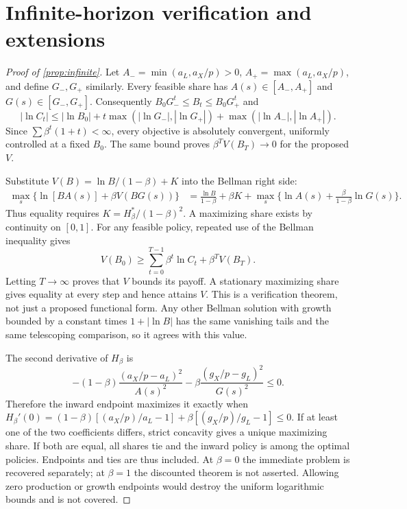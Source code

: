 \documentclass[11pt,a4paper]{article}
\theoremstyle{definition}\newtheorem{definition}{Definition}
\begin{document}
\section{Infinite-horizon verification and extensions}
\label{app:infinite-proof}
\begin{proof}[Proof of \cref{prop:infinite}]
Let $A_-=\min(a_L,a_X/p)>0$, $A_+=\max(a_L,a_X/p)$, and define
$G_-,G_+$ similarly. Every feasible share has $A(s)\in[A_-,A_+]$
and $G(s)\in[G_-,G_+]$. Consequently
$B_0G_-^t\leq B_t\leq B_0G_+^t$ and
\[
 |\ln C_t|\leq |\ln B_0|+
 t\max(|\ln G_-|,|\ln G_+|)+
 \max(|\ln A_-|,|\ln A_+|).
\]
Since $\sum\beta^t(1+t)<\infty$, every objective is absolutely
convergent, uniformly controlled at a fixed $B_0$. The same bound proves
$\beta^T V(B_T)\to0$ for the proposed $V$.

Substitute $V(B)=\ln B/(1-\beta)+K$ into the Bellman right side:
\begin{align*}
 \max_s\{\ln[BA(s)]+\beta V(BG(s))\}
 &=\frac{\ln B}{1-\beta}+\beta K+
 \max_s\{\ln A(s)+\tfrac\beta{1-\beta}\ln G(s)\}.
\end{align*}
Thus equality requires $K=H_\beta^*/(1-\beta)^2$. A maximizing share
exists by continuity on $[0,1]$. For any feasible policy, repeated use of
the Bellman inequality gives
\[
 V(B_0)\geq\sum_{t=0}^{T-1}\beta^t\ln C_t+\beta^TV(B_T).
\]
Letting $T\to\infty$ proves that $V$ bounds its payoff. A stationary
maximizing share gives equality at every step and hence attains $V$.
This is a verification theorem, not just a proposed functional form.
Any other Bellman solution with growth bounded by a constant times
$1+|\ln B|$ has the same vanishing tails and the same telescoping
comparison, so it agrees with this value.

The second derivative of $H_\beta$ is
\[
 -(1-\beta)\frac{(a_X/p-a_L)^2}{A(s)^2}
 -\beta\frac{(g_X/p-g_L)^2}{G(s)^2}\leq0.
\]
Therefore the inward endpoint maximizes it exactly when
$H_\beta'(0)=(1-\beta)[(a_X/p)/a_L-1]+
\beta[(g_X/p)/g_L-1]\leq0$.
If at least one of the two coefficients differs, strict concavity gives
a unique maximizing share. If both are equal, all shares tie and the
inward policy is among the optimal policies. Endpoints and ties are thus
included. At $\beta=0$ the immediate problem is recovered separately;
at $\beta=1$ the discounted theorem is not asserted. Allowing zero
production or growth endpoints would destroy the uniform logarithmic
bounds and is not covered.
\end{proof}
\end{document}

